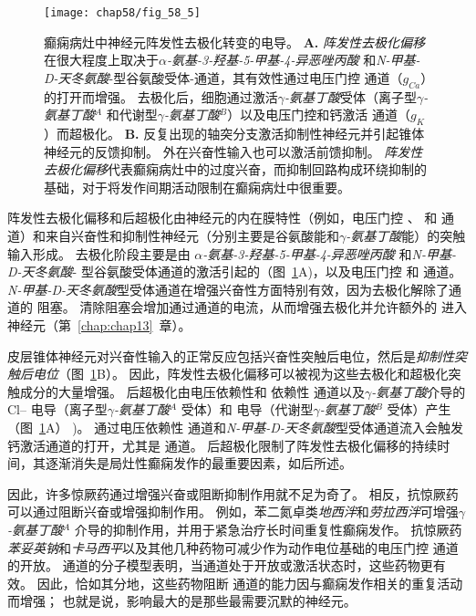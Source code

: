\begin{figure}[htbp]
	\centering
	\texttt{[image: chap58/fig\_58\_5]}
	\caption{癫痫病灶中神经元阵发性去极化转变的电导。
		\textbf{A.} \textit{阵发性去极化偏移}在很大程度上取决于\textit{$\alpha$-氨基-3-羟基-5-甲基-4-异恶唑丙酸} 和\textit{N-甲基-D-天冬氨酸}-型谷氨酸受体-通道，其有效性通过电压门控  通道（$ g_{Ca} $）的打开而增强。
		去极化后，细胞通过激活\textit{$\gamma$-氨基丁酸}受体（离子型\textit{$\gamma$-氨基丁酸}$^A$ 和代谢型\textit{$\gamma$-氨基丁酸}$^B$）以及电压门控和钙激活  通道（$ g_K $）而超极化\cite{lothman1993neurobiology}。
		\textbf{B.} 反复出现的轴突分支激活抑制性神经元并引起锥体神经元的反馈抑制。
		外在兴奋性输入也可以激活前馈抑制。
		\textit{阵发性去极化偏移}代表癫痫病灶中的过度兴奋，而抑制回路构成环绕抑制的基础，对于将发作间期活动限制在癫痫病灶中很重要。}
	\label{fig:58_5}
\end{figure}


阵发性去极化偏移和后超极化由神经元的内在膜特性（例如，电压门控 、 和  通道）和来自兴奋性和抑制性神经元（分别主要是谷氨酸能和\textit{$\gamma$-氨基丁酸}能）的突触输入形成。
去极化阶段主要是由 \textit{$\alpha$-氨基-3-羟基-5-甲基-4-异恶唑丙酸} 和\textit{N-甲基-D-天冬氨酸}- 型谷氨酸受体通道的激活引起的（图~\ref{fig:58_5}A)，以及电压门控  和  通道。
\textit{N-甲基-D-天冬氨酸}型受体通道在增强兴奋性方面特别有效，因为去极化解除了通道的  阻塞。
清除阻塞会增加通过通道的电流，从而增强去极化并允许额外的  进入神经元（第~\ref{chap:chap13}~章）。


皮层锥体神经元对兴奋性输入的正常反应包括兴奋性突触后电位，然后是\textit{抑制性突触后电位}（图~\ref{fig:58_5}B）。
因此，阵发性去极化偏移可以被视为这些去极化和超极化突触成分的大量增强。
后超极化由电压依赖性和  依赖性  通道以及\textit{$\gamma$-氨基丁酸}介导的 Cl– 电导（离子型\textit{$\gamma$-氨基丁酸}$^A$ 受体）和  电导（代谢型\textit{$\gamma$-氨基丁酸}$^B$ 受体）产生（图~\ref{fig:58_5}A） )。
 通过电压依赖性  通道和\textit{N-甲基-D-天冬氨酸}型受体通道流入会触发钙激活通道的打开，尤其是  通道。
后超极化限制了阵发性去极化偏移的持续时间，其逐渐消失是局灶性癫痫发作的最重要因素，如后所述。


因此，许多惊厥药通过增强兴奋或阻断抑制作用就不足为奇了。
相反，抗惊厥药可以通过阻断兴奋或增强抑制作用。 例如，苯二氮卓类\textit{地西泮}和\textit{劳拉西泮}可增强\textit{$\gamma$-氨基丁酸}$^A$ 介导的抑制作用，并用于紧急治疗长时间重复性癫痫发作。
抗惊厥药\textit{苯妥英钠}和\textit{卡马西平}以及其他几种药物可减少作为动作电位基础的电压门控  通道的开放。
 通道的分子模型表明，当通道处于开放或激活状态时，这些药物更有效。
因此，恰如其分地，这些药物阻断  通道的能力因与癫痫发作相关的重复活动而增强；
也就是说，影响最大的是那些最需要沉默的神经元。



